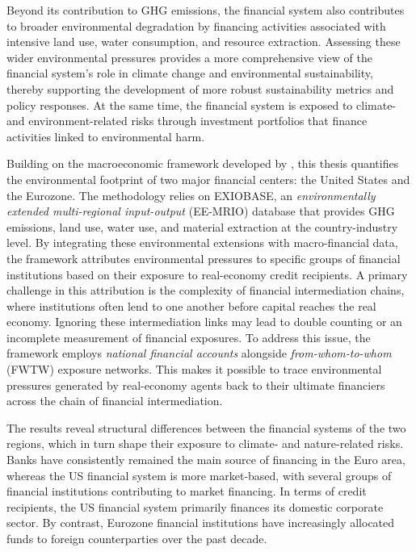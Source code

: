 Beyond its contribution to GHG emissions, the financial system also contributes to broader environmental degradation by financing activities associated with intensive land use, water consumption, and resource extraction. Assessing these wider environmental pressures provides a more comprehensive view of the financial system’s role in climate change and environmental sustainability, thereby supporting the development of more robust sustainability metrics and policy responses. At the same time, the financial system is exposed to climate- and environment-related risks through investment portfolios that finance activities linked to environmental harm.

Building on the macroeconomic framework developed by \textcite{jondeau_environmental_2026}, this thesis quantifies the environmental footprint of two major financial centers: the United States and the Eurozone. The methodology relies on EXIOBASE, an \textit{environmentally extended multi-regional input-output} (EE-MRIO) database that provides GHG emissions, land use, water use, and material extraction at the country-industry level. By integrating these environmental extensions with macro-financial data, the framework attributes environmental pressures to specific groups of financial institutions based on their exposure to real-economy credit recipients. A primary challenge in this attribution is the complexity of financial intermediation chains, where institutions often lend to one another before capital reaches the real economy. Ignoring these intermediation links may lead to double counting or an incomplete measurement of financial exposures. To address this issue, the framework employs \textit{national financial accounts} alongside \textit{from-whom-to-whom} (FWTW) exposure networks. This makes it possible to trace environmental pressures generated by real-economy agents back to their ultimate financiers across the chain of financial intermediation.

The results reveal structural differences between the financial systems of the two regions, which in turn shape their exposure to climate- and nature-related risks. Banks have consistently remained the main source of financing in the Euro area, whereas the US financial system is more market-based, with several groups of financial institutions contributing to market financing. In terms of credit recipients, the US financial system primarily finances its domestic corporate sector. By contrast, Eurozone financial institutions have increasingly allocated funds to foreign counterparties over the past decade.

